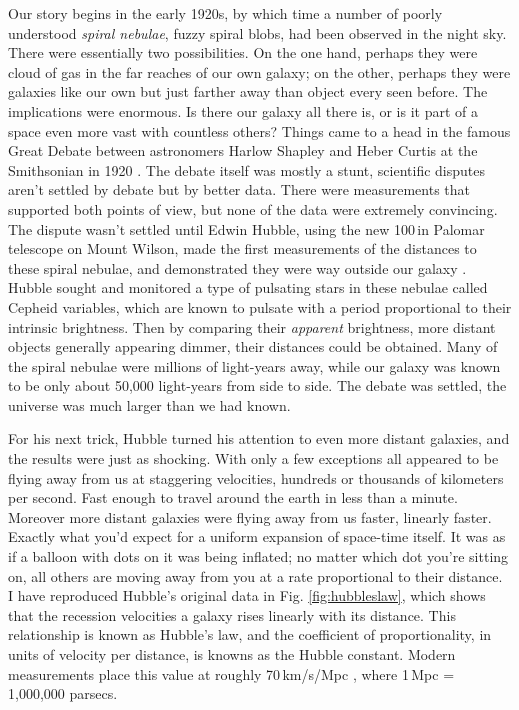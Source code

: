 Our story begins in the early 1920s, by which time a number of poorly understood \textit{spiral nebulae}, fuzzy spiral blobs, had been observed in the night sky. There were essentially two possibilities. On the one hand, perhaps they were cloud of gas in the far reaches of our own galaxy; on the other, perhaps they were galaxies like our own but just farther away than object every seen before. The implications were enormous. Is there our galaxy all there is, or is it part of a space even more vast with countless others? Things came to a head in the famous Great Debate between astronomers Harlow Shapley and Heber Curtis at the Smithsonian in 1920 \citep{greatdebate}. The debate itself was mostly a stunt, scientific disputes aren't settled by debate but by better data. There were measurements that supported both points of view, but none of the data were extremely convincing. The dispute wasn't settled until Edwin Hubble, using the new 100\,in Palomar telescope on Mount Wilson, made the first measurements of the distances to these spiral nebulae, and demonstrated they were way outside our galaxy \citep{hubble26}. Hubble sought and monitored a type of pulsating stars in these nebulae called Cepheid variables, which are known to pulsate with a period proportional to their intrinsic brightness. Then by comparing their \textit{apparent} brightness, more distant objects generally appearing dimmer, their distances could be obtained. Many of the spiral nebulae were millions of light-years away, while our galaxy was known to be only about 50,000 light-years from side to side. The debate was settled, the universe was much larger than we had known.

For his next trick, Hubble turned his attention to even more distant galaxies, and the results were just as shocking. With only a few exceptions all appeared to be flying away from us at staggering velocities, hundreds or thousands of kilometers per second. Fast enough to travel around the earth in less than a minute. Moreover more distant galaxies were flying away from us faster, linearly faster. Exactly what you'd expect for a uniform expansion of space-time itself. It was as if a balloon with dots on it was being inflated; no matter which dot you're sitting on, all others are moving away from you at a rate proportional to their distance. I have reproduced Hubble's original data in Fig. \ref{fig:hubbleslaw}, which shows that the recession velocities a galaxy rises linearly with its distance. This relationship is known as Hubble's law, and the coefficient of proportionality, in units of velocity per distance, is knowns as the Hubble constant. Modern measurements place this value at roughly 70\,km/s/Mpc \citep{reiss16,planck16}, where 1\,Mpc = 1,000,000 parsecs. 


